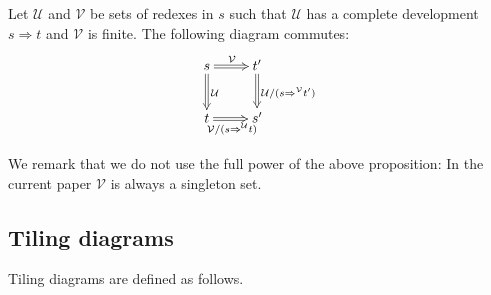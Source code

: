 \documentclass{LMCS}
\theoremstyle{plain}
\theoremstyle{definition}
\newcommand{\dev}{\Rightarrow}
\begin{document}
\begin{prop}
\label{prop:one_more}
Let $\mathcal{U}$ and $\mathcal{V}$ be sets of redexes in $s$
such that $\mathcal{U}$ has a complete development $s \dev t$ and 
$\mathcal{V}$ is finite. The following diagram commutes:
\[
\xymatrix{
s \ar@{=>}[r]^{\mathcal{V}} \ar@{=>}[d]^{\mathcal{U}} & t'
\ar@{=>}[d]^{\mathcal{U}/(s \dev^\mathcal{V} t')} \\
t \ar@{=>}[r]_{\mathcal{V}/(s \dev^\mathcal{U} t)} & s'
}
\]
\end{prop}
We remark that we do not use the full power of the above proposition: In the current paper $\mathcal{V}$ is always a singleton set.

\subsection{Tiling diagrams}
\label{sec:tile}

Tiling diagrams are defined as follows.
\end{document}

